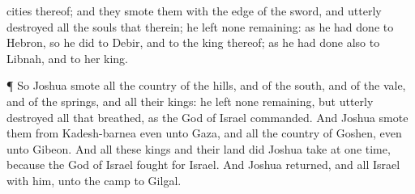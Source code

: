 {cities thereof; and they
smote them with the
edge of the
sword, and utterly
destroyed all the
souls that
{} therein; he
left none
remaining: as he had
done to
Hebron, so he
did to
Debir, and to the
king thereof; as he had
done also to
Libnah, and to her
king.
\par }{\PP {}¶ So
Joshua
smote all the
country of the
hills, and of the
south, and of the
vale, and of the
springs, and all their
kings: he
left none
remaining, but utterly
destroyed all that
breathed, as the
{}
God of
Israel
commanded.
And
Joshua
smote them from
Kadesh-barnea even unto
Gaza, and all the
country of
Goshen, even unto
Gibeon.
And all these
kings and their
land did
Joshua
take at
one
time, because the
{}
God of
Israel
fought for
Israel.
And
Joshua
returned, and all
Israel with him, unto the
camp to
Gilgal.

}

